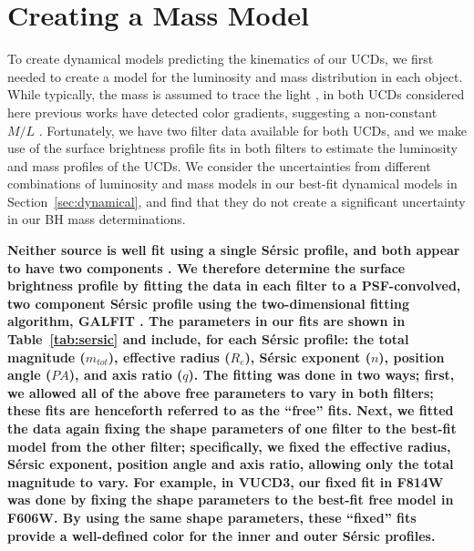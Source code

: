 \documentclass{aastex}
\begin{document}
\section{Creating a Mass Model} \label{sec:mge}
To create dynamical models predicting the kinematics of our UCDs, we first needed to create a model for the luminosity and mass distribution in each object.  While typically, the mass is assumed to trace the light \citep[e.g.][]{seth14}, in both UCDs considered here previous works have detected color gradients, suggesting a non-constant $M/L$ \citep{chilingarianmamon08,evstigneeva08}. Fortunately, we have two filter data available for both UCDs, and we make use of the surface brightness profile fits in both filters to estimate the luminosity and mass profiles of the UCDs. We consider the uncertainties from different combinations of luminosity and mass models in our best-fit dynamical models in Section~\ref{sec:dynamical}, and find that they do not create a significant uncertainty in our BH mass determinations.

\textbf{Neither source is well fit using a single S\'ersic profile, and both appear to have two components \citep{evstigneeva07,chilingarianmamon08}. We therefore determine the surface brightness profile by fitting the data in each filter to a PSF-convolved, two component S\'ersic profile using the two-dimensional fitting algorithm, GALFIT \citep{peng02}. The parameters in our fits are shown in Table~\ref{tab:sersic} and include, for each S\'ersic profile: the total magnitude ($m_{tot}$), effective radius ($R_e$), S\'ersic exponent ($n$), position angle ($PA$), and axis ratio ($q$). The fitting was done in two ways; first, we allowed all of the above free parameters to vary in both filters; these fits are henceforth referred to as the ``free'' fits. Next, we fitted the data again fixing the shape parameters of one filter to the best-fit model from the other filter; specifically, we fixed the effective radius, S\'ersic exponent, position angle and axis ratio, allowing only the total magnitude to vary.  For example, in VUCD3, our fixed fit in F814W was done by fixing the shape parameters to the best-fit free model in F606W. By using the same shape parameters, these ``fixed'' fits provide a well-defined color for the inner and outer S\'ersic profiles.}
\end{document}
